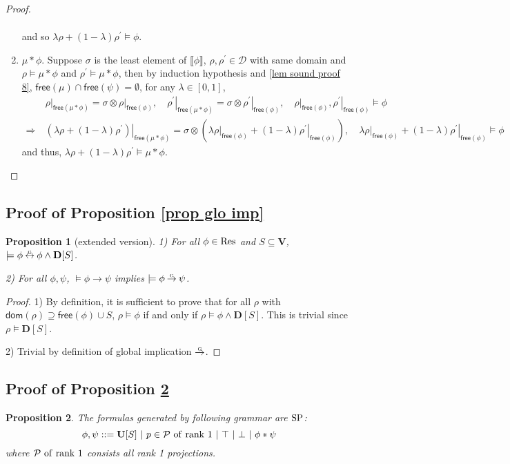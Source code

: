 \documentclass[conference,compsoc, 10pt]{IEEEtran}
\newtheorem{proposition}{Proposition}[section]
\newcommand {\cD } {{\mathcal{D}}}
\newcommand {\cP } {{\mathcal{P}}}
\newcommand {\bD} {{\mathbf{D}}}
\newcommand {\dom }[1] {{\mathsf{dom}\!\left(#1\right)}}
\newcommand {\free }[1] {{\mathsf{free}\left(#1\right)}}
\newcommand {\rt }[2] {{\left.{#1}\right|_{#2}}}
\newcommand {\vars } {\mathbf{V}}
\newcommand {\unia } {{\mathbf{U}}}
\newcommand {\sem}[1] {\llbracket#1\rrbracket}
\DeclareRobustCommand{\gimp}{%
	\mathbin{\ooalign{$\rightarrow$\cr\hss\raisebox{1ex}{\scalebox{.5}{G}}\hss}}}
\DeclareRobustCommand{\gimplr}{%
	\mathbin{\ooalign{$\leftrightarrow$\cr\hss\raisebox{1ex}{\scalebox{.5}{G}}\hss}}}
\begin{document}
\begin{appendices}
\begin{proof}
\begin{enumerate}
\begin{align*}
				\end{align*}
				and so $\lambda\rho + (1-\lambda)\rho^\prime\models\phi$.
				\item $\mu\ast\phi$. Suppose $\sigma$ is the least element of $\sem{\phi}$, $\rho,\rho^\prime\in\cD$ with same domain and $\rho\models \mu\ast\phi$ and $\rho^\prime\models \mu\ast\phi$, then by induction hypothesis and \ref{lem sound proof 8}, $\free{\mu}\cap\free{\psi} = \emptyset$, for any $\lambda\in[0,1]$, 
				\begin{align*}
				&\rt{\rho}{\free{\mu\ast\phi}} = \sigma \otimes \rt{\rho}{\free{\phi}},\quad \rt{\rho^\prime}{\free{\mu\ast\phi}} = \sigma \otimes \rt{\rho^\prime}{\free{\phi}},\quad \rt{\rho}{\free{\phi}},\rt{\rho^\prime}{\free{\phi}}\models\phi \\
				\Rightarrow\ &\rt{\left(\lambda\rho + (1-\lambda)\rho^\prime\right)}{\free{\mu\ast\phi}} = \sigma \otimes \left(\lambda\rt{\rho}{\free{\phi}} + (1-\lambda)\rt{\rho^\prime}{\free{\phi}} \right),\quad \lambda\rt{\rho}{\free{\phi}} + (1-\lambda)\rt{\rho^\prime}{\free{\phi}} \models\phi
				\end{align*}
				and thus, $\lambda\rho + (1-\lambda)\rho^\prime\models\mu\ast\phi$.
			\end{enumerate}
		\end{proof}
		
		\subsection{Proof of Proposition \ref{prop glo imp}}
		
		\begin{proposition}[extended version]
			\label{prop glo imp app}
			1) For all $\phi\in{\rm Res}$ and $S\subseteq \vars$, $\models \phi\gimplr \phi\wedge \bD[S]$.
			
			2) For all $\phi,\psi$, $\models\phi\rightarrow\psi$ implies $\models\phi\gimp\psi$.
		\end{proposition}
		\begin{proof}
			1) By definition, it is sufficient to prove that for all $\rho$ with $\dom{\rho}\supseteq\free{\phi}\cup S$, $\rho\models\phi$ if and only if $\rho\models\phi\wedge\bD[S]$. This is trivial since $\rho\models\bD[S]$.
			
			2) Trivial by definition of global implication $\gimp$.
		\end{proof}
		
		\subsection{Proof of Proposition \ref{prop SP}}
		\label{sec app sub proof prop SP}
		\begin{proposition}
			\label{prop SP}
			The formulas generated by following grammar are ${\rm SP}$: 
			$$
			\phi,\psi ::= \unia[S]\ |\ p\in\cP {\rm\ of\ rank\ } 1\ |\ \top\ |\ \bot\ |\ \phi\ast\psi
			$$
			where $\cP {\rm\ of\ rank\ } 1$ consists all rank 1 projections.
		\end{proposition}
		

\end{appendices}
\end{document}

